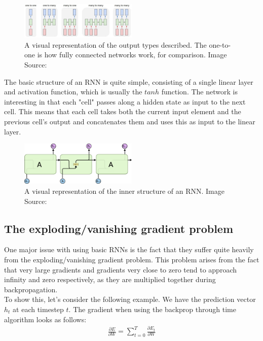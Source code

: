 \begin{figure}[h]
    \centering
        \includegraphics[width=0.5\textwidth]{latex/imgs/rnn_types.png}
    \caption{A visual representation of the output types described. The one-to-one is how fully connected networks work, for comparison. Image Source:\cite{rnn}}
\end{figure}

\noindent
The basic structure of an RNN is quite simple, consisting of a single linear layer and activation function, which is usually the $tanh$ function. The network is interesting in that each "cell" passes along a hidden state as input to the next cell. This means that each cell takes both the current input element and the previous cell's output and concatenates them and uses this as input to the linear layer.

\begin{figure}[h]
    \centering
        \includegraphics[width=0.5\textwidth]{latex/imgs/rnn.png}
    \caption{A visual representation of the inner structure of an RNN. Image Source:\cite{rnn}}
\end{figure}

\subsection{The exploding/vanishing gradient problem}
One major issue with using basic RNNs is the fact that they suffer quite heavily from the exploding/vanishing gradient problem. This problem arises from the fact that very large gradients and gradients very close to zero tend to approach infinity and zero respectively, as they are multiplied together during backpropagation.\\

\noindent
To show this, let's consider the following example. We have the prediction vector $h_t$ at each timestep $t$. The gradient when using the backprop through time algorithm looks as follows:
\begin{align}
    \frac{\partial E}{\partial W} = \sum_{t=0}^{T} \frac{\partial E_t}{\partial W}
\end{align}

